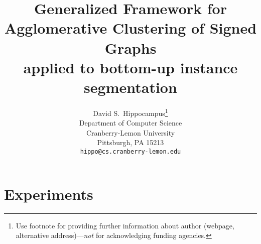 \documentclass{article}
\title{Generalized Framework for \\Agglomerative Clustering of Signed Graphs \\applied to bottom-up instance segmentation}
\author{%
  David S.~Hippocampus\thanks{Use footnote for providing further information
    about author (webpage, alternative address)---\emph{not} for acknowledging
    funding agencies.} \\
  Department of Computer Science\\
  Cranberry-Lemon University\\
  Pittsburgh, PA 15213 \\
  \texttt{hippo@cs.cranberry-lemon.edu} \\
}
\begin{document}
\maketitle













\section{Experiments}









{\small


}

\end{document}
